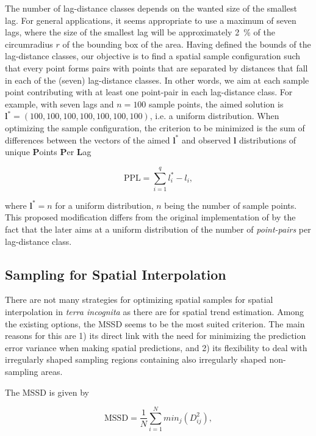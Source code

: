 The number of lag-distance classes depends on the wanted size of the smallest lag. For general 
applications, it seems appropriate to use a maximum of seven lags, where the size of the smallest lag will be 
approximately \SI{2}{\percent} of the circumradius $r$ of the bounding box of the area. Having defined the 
bounds of the lag-distance classes, our objective is to find a spatial sample configuration such that every 
point forms pairs with points that are separated by distances that fall in each of the (seven) lag-distance 
classes. In other words, we aim at each sample point contributing with at least one point-pair in each 
lag-distance class. For example, with seven lags and $n = 100$ sample points, the aimed solution is 
$\boldsymbol{l}^* = (100, 100, 100, 100, 100, 100, 100)$, i.e. a uniform distribution. When optimizing the 
sample configuration, the criterion to be minimized is the sum of differences between the vectors of the aimed 
$\boldsymbol{l}^*$ and observed $\boldsymbol{l}$ distributions of unique \textbf{P}oints \textbf{P}er 
\textbf{L}ag

\begin{equation}\label{eqn:chap08-ppl}
 \text{PPL} = \sum_{i = 1}^{q} l_i^* - l_i,
\end{equation}

\noindent where $\boldsymbol{l}^* = n$ for a uniform distribution, $n$ being the number of sample points. This 
proposed modification differs from the original implementation of \citet{WarrickEtAl1987} by the fact that the 
later aims at a uniform distribution of the number of \emph{point-pairs} per lag-distance class.

\subsection{Sampling for Spatial Interpolation}

There are not many strategies for optimizing spatial samples for spatial interpolation in \emph{terra 
incognita} as there are for spatial trend estimation. Among the existing options, the MSSD seems to be the most 
suited criterion. The main reasons for this are 1) its direct link with the need for minimizing the prediction 
error variance when making spatial predictions, and 2) its flexibility to deal with irregularly shaped sampling 
regions containing also irregularly shaped non-sampling areas.

The MSSD is given by

\begin{equation}
 \text{MSSD} = \frac{1}{N} \sum_{i = 1}^{N} min_j(D_{ij}^2),
\end{equation}

